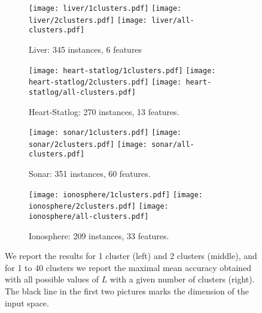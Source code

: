\begin{figure*}[h!]
  \begin{subfigure}{\textwidth}
    \centering
      \texttt{[image: liver/1clusters.pdf]}
      \texttt{[image: liver/2clusters.pdf]}
      \texttt{[image: liver/all-clusters.pdf]}\\
     \caption{Liver: 345 instances, 6 features}
     \label{fig:liver}
   \end{subfigure}

   \begin{subfigure}{\textwidth}
      \centering
        \texttt{[image: heart-statlog/1clusters.pdf]}
        \texttt{[image: heart-statlog/2clusters.pdf]}
        \texttt{[image: heart-statlog/all-clusters.pdf]}\\
       \caption{Heart-Statlog: 270 instances, 13 features.}
       \label{fig:heart}
    \end{subfigure}
    \begin{subfigure}{\textwidth}
      \centering
        \texttt{[image: sonar/1clusters.pdf]}
        \texttt{[image: sonar/2clusters.pdf]}
        \texttt{[image: sonar/all-clusters.pdf]}\\
       \caption{Sonar: 351 instances, 60 features.}
       \label{fig:sonar}
    \end{subfigure}
    \begin{subfigure}{\textwidth}
      \centering
        \texttt{[image: ionosphere/1clusters.pdf]}
        \texttt{[image: ionosphere/2clusters.pdf]}
        \texttt{[image: ionosphere/all-clusters.pdf]}\\
       \caption{Ionosphere: 209 instances, 33 features.}
       \label{fig:ionosphere}
    \end{subfigure}
  \caption{We report the results for 1 cluster (left) and 2 clusters (middle), and for 1 to 40 clusters we report the maximal mean accuracy obtained with all possible values of $L$ with a given number of clusters (right). The black line in the first two pictures marks the dimension of the input space.}
  \label{fig:uci}
\end{figure*}